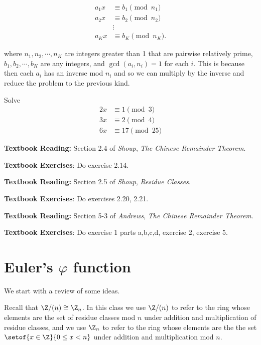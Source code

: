 \documentclass[oneside,12pt]{amsart}
\begin{document}
\begin{align*}
a_1 x &\equiv b_1 \pmod{n_1} \\
a_2 x &\equiv b_2 \pmod{n_2} \\
  &\vdots \\
a_K x &\equiv b_K \pmod{n_K}.
\end{align*}

where $n_1,n_2,\cdots,n_K$ are integers greater than 1 that are pairwise relatively prime, 
$b_1,b_2,\cdots,b_K$ are any integers, and $\gcd(a_i,n_i)=1$ for each $i$. This is because
then each $a_i$ has an inverse mod $n_i$ and so we can multiply by the inverse and
reduce the problem to the previous kind.

\begin{in_class_example}
Solve
\begin{align*}
2x &\equiv 1 \pmod 3 \\
3x &\equiv 2 \pmod 4 \\
6x &\equiv 17 \pmod {25}
\end{align*}
\end{in_class_example}

\textbf{Textbook Reading:} Section 2.4 of \emph{Shoup}, \emph{The Chinese Remainder Theorem}.

\textbf{Textbook Exercises}: Do exercise 2.14.

\bigskip

\textbf{Textbook Reading:} Section 2.5 of \emph{Shoup}, \emph{Residue Classes}.

\textbf{Textbook Exercises}: Do exercises 2.20, 2.21.

\bigskip

\textbf{Textbook Reading:} Section 5-3 of \emph{Andrews}, \emph{The Chinese Remainder Theorem}.

\textbf{Textbook Exercises}: Do exercise 1 parts a,b,c,d, exercise 2, exercise 5.

\newpage

\section{Euler's $\varphi$ function}
We start with a review of some ideas.

Recall that $\Z/(n) \cong \Z_n$. In this class we use $\Z/(n)$ to refer to the 
ring whose elements are the set of residue classes mod $n$ under addition and
multiplication of residue classes, and we use $\Z_n$ to refer to the ring whose
elements are the the set $\setof{x\in\Z}{0\leq x < n}$ under addition and multiplication mod $n$.
\end{document}
